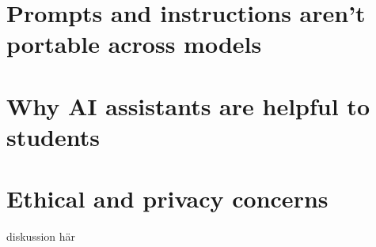 \section{Prompts and instructions aren't portable across models}




\section{Why AI assistants are helpful to students}




\section{Ethical and privacy concerns}








%






diskussion här


\cleardoublepage